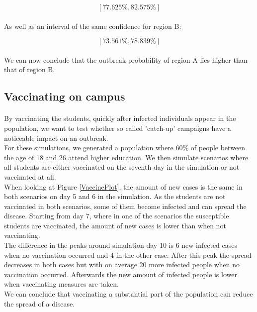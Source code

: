 \documentclass[runningheads]{llncs}
\begin{document}
$$ [77.625\%, 82.575\%] $$

\paragraph{} As well as an interval of the same confidence for region B:

$$ [73.561\%, 78.839\%] $$

\paragraph{} We can now conclude that the outbreak probability of region A lies higher than that of region B.

\subsection{Vaccinating on campus}

\paragraph{} By vaccinating the students, quickly after infected individuals appear in the population,
we want to test whether so called 'catch-up' campaigns have a noticeable impact on an outbreak. \\
For these simulations, we generated a population where 60\% of people between the age of 18 and 26 attend higher education. We then simulate scenarios where all students are either vaccinated on the seventh day in the simulation or not vaccinated at all.
\\
When looking at Figure \ref{VaccinePlot}, the amount of new cases is the same in both scenarios on day 5 and 6 in the simulation. As the students are not vaccinated in both scenarios, some of them become infected and can spread the disease. Starting from day 7, where in one of the scenarios the susceptible students are vaccinated, the amount of new cases is lower than when not vaccinating.\\
The difference in the peaks around simulation day 10 is 6 new infected cases when no vaccination occurred and 4 in the other case. After this peak the spread decreases in both cases but with on average 20 more infected people when no vaccination occurred. Afterwards the new amount of infected people is lower when vaccinating measures are taken.
\\
We can conclude that vaccinating a substantial part of the population can reduce the spread of a disease.
\end{document}
